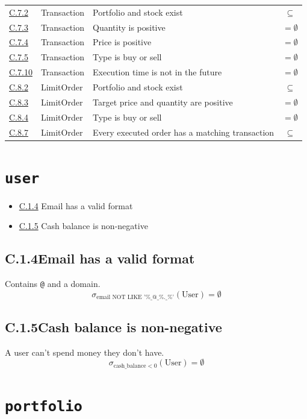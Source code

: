 \documentclass{article}
\newcommand{\cl}[1]{\hyperref[c:#1]{C.#1}}
\newcommand{\constraint}[2]{\phantomsection\label{c:#1}\subsection*{C.#1\quad #2}}
\begin{document}
\begin{longtable}{@{}l l l c@{}}
\midrule
\cl{7.2}  & Transaction       & Portfolio and stock exist                        & $\subseteq$ \\
\cl{7.3}  & Transaction       & Quantity is positive                             & $=\emptyset$ \\
\cl{7.4}  & Transaction       & Price is positive                                & $=\emptyset$ \\
\cl{7.5}  & Transaction       & Type is buy or sell                              & $=\emptyset$ \\
\cl{7.10} & Transaction       & Execution time is not in the future              & $=\emptyset$ \\
\midrule
\cl{8.2}  & LimitOrder        & Portfolio and stock exist                        & $\subseteq$ \\
\cl{8.3}  & LimitOrder        & Target price and quantity are positive           & $=\emptyset$ \\
\cl{8.4}  & LimitOrder        & Type is buy or sell                              & $=\emptyset$ \\
\cl{8.7}  & LimitOrder        & Every executed order has a matching transaction  & $\subseteq$ \\
\bottomrule
\end{longtable}

\newpage

\section{\texttt{user}}

\begin{itemize}[nosep]
  \item \cl{1.4} Email has a valid format
  \item \cl{1.5} Cash balance is non-negative
\end{itemize}

\constraint{1.4}{Email has a valid format}
Contains \texttt{@} and a domain.
\[ \sigma_{\text{email} \text{ NOT LIKE } \text{'\%\_@\_\%.\_\%'}}(\text{User}) = \emptyset \]

\constraint{1.5}{Cash balance is non-negative}
A user can't spend money they don't have.
\[ \sigma_{\text{cash\_balance} < 0}(\text{User}) = \emptyset \]

\section{\texttt{portfolio}}
\end{document}
